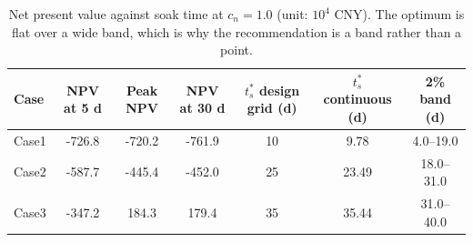 \begin{table}[htbp]
\centering
\caption{Net present value against soak time at $c_n=1.0$ (unit: $10^4$ CNY). The optimum is flat over a wide band, which is why the recommendation is a band rather than a point.}
\label{tab:npv}
\small
\begin{tabular}{@{}lcccccc@{}}
\toprule
Case & NPV at 5 d & Peak NPV & NPV at 30 d & $t_s^\ast$ design grid (d) & $t_s^\ast$ continuous (d) & 2\% band (d) \\
\midrule
Case1 & -726.8 & -720.2 & -761.9 & 10 & 9.78 & 4.0--19.0 \\
Case2 & -587.7 & -445.4 & -452.0 & 25 & 23.49 & 18.0--31.0 \\
Case3 & -347.2 & 184.3 & 179.4 & 35 & 35.44 & 31.0--40.0 \\
\bottomrule
\end{tabular}
\end{table}
